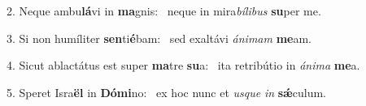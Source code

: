 2. Neque ambu\textbf{lá}vi in \textbf{ma}gnis: \ast\  neque in mira\textit{bí}\textit{li}\textit{bus} \textbf{su}per me.\

3. Si non humíliter \textbf{sen}ti\textbf{é}bam: \ast\  sed exaltávi \textit{á}\textit{ni}\textit{mam} \textbf{me}am.\

4. Sicut ablactátus est super \textbf{ma}tre \textbf{su}a: \ast\  ita retribútio in \textit{á}\textit{ni}\textit{ma} \textbf{me}a.\

5. Speret Isra\textbf{ël} in \textbf{Dó}\textbf{mi}no: \ast\  ex hoc nunc et \textit{us}\textit{que} \textit{in} \textbf{sǽ}culum.\


